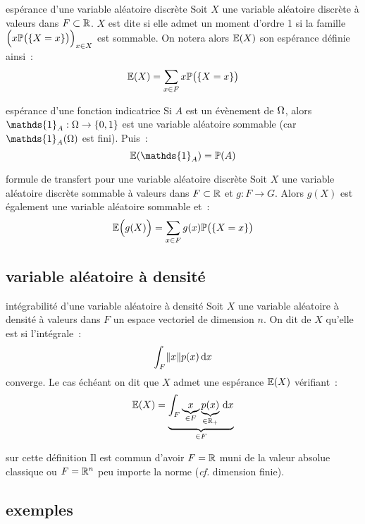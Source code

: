 \begin{definition}{}{espérance d'une variable aléatoire discrète}
    Soit $X$ une variable aléatoire discrète à valeurs dans $F \subset \mathbb{R}$.
    $X$ est dite  si elle admet un moment d'ordre 1 \ie si la famille $\Big(x\mathbb{P}\big(\{X = x\}\big)\Big)_{x \in X}$ est sommable. On notera alors $\mathbb{E}(X)$ son espérance définie ainsi~:
    $$\mathbb{E}(X) = \sum_{x \in F} x\mathbb{P}\big(\{X = x\}\big)$$
    
\end{definition}

\begin{exemple}{}{espérance d'une fonction indicatrice}
    Si $A$ est un évènement de $\Omega$, alors $\mathds{1}_A : \univ \to \{0, 1\}$ est une variable aléatoire sommable (car $\mathds{1}_A(\univ)$ est fini). Puis~:
    $$\mb{E}(\mathds{1}_A) = \proba(A)$$
\end{exemple}

\begin{theoreme}{}{formule de transfert pour une variable aléatoire discrète}
    Soit $X$ une variable aléatoire discrète sommable à valeurs dans $F \subset \mathbb{R}$ et $g : F \to G$. Alors $g(X)$ est également une variable aléatoire sommable et~:
    $$\mathbb{E}\Big(g(X)\Big) = \sum_{x \in F}g(x)\mathbb{P}\big(\{X = x\}\big)$$
\end{theoreme}

\subsection{variable aléatoire à densité}

\begin{definition}{}{intégrabilité d'une variable aléatoire à densité}
    Soit $X$ une variable aléatoire à densité à valeurs dans $F$ un espace vectoriel de dimension $n$. On dit de $X$ qu'elle est  si l'intégrale~:
    $$\int_F \lVert x\rVert p(x) \,\mathrm{d}x$$
    converge. Le cas échéant on dit que $X$ admet une espérance $\mathbb{E}(X)$ vérifiant~:
    $$\mathbb{E}(X) = \underbrace{\int_F \underbrace{x}_{\in F} \underbrace{p(x)}_{\in \mathbb{R}_+}\,\mathrm{d}x}_{\in F}$$
\end{definition}

\begin{remarque}{}{sur cette définition}
    Il est commun d'avoir $F = \mathbb{R}$ muni de la valeur absolue classique ou $F = \mathbb{R}^n$ peu importe la norme (\textit{cf.} dimension finie).
\end{remarque}

\subsection{exemples}


